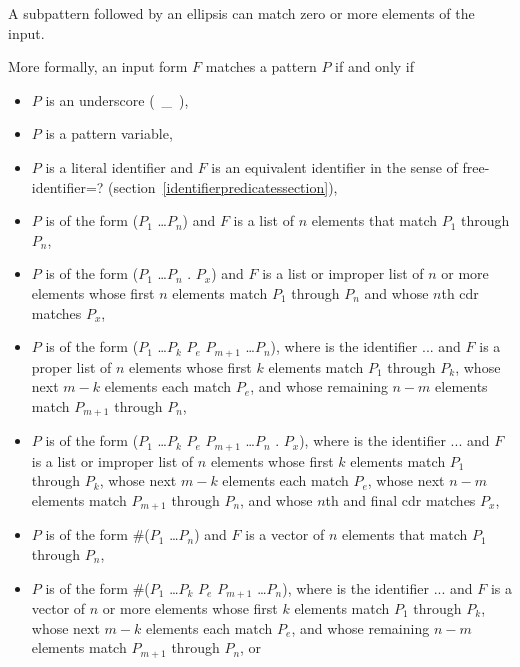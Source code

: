 \begin{entry}{%
}
A subpattern followed by an ellipsis can match zero or more elements of
the input.

More formally, an input form $F$ matches a pattern $P$ if and only if

\begin{itemize}
\item $P$ is an underscore (~{\cf \_}~),

\item $P$ is a pattern variable,

\item $P$ is a literal identifier
and $F$ is an equivalent identifier in the
sense of {\cf free-identifier=?}
(section~\ref{identifierpredicatessection}),

\item $P$ is of the form
{\cf ($P_1$ \dots $P_n$)}
and $F$ is a list of $n$ elements that match $P_1$ through
$P_n$,

\item $P$ is of the form
{\cf ($P_1$ \dots $P_n$ . $P_x$)}
and $F$ is a list or improper list of $n$ or more elements
whose first $n$ elements match $P_1$ through $P_n$
and
whose $n$th cdr matches $P_x$,

\item $P$ is of the form
{\cf ($P_1$ \dots $P_k$ $P_e$  $P_{m+1}$ \dots $P_n$)},
where  is the identifier {\cf ...}
and $F$ is a proper list of $n$
elements whose first $k$ elements match $P_1$ through $P_k$,
whose next $m-k$ elements each match $P_e$,
and
whose remaining $n-m$ elements match $P_{m+1}$ through $P_n$,

\item $P$ is of the form
{\cf ($P_1$ \dots $P_k$ $P_e$  $P_{m+1}$ \dots $P_n$ . $P_x$)},
where  is the identifier {\cf ...}
and $F$ is a list or improper list of $n$
elements whose first $k$ elements match $P_1$ through $P_k$,
whose next $m-k$ elements each match $P_e$,
whose next $n-m$ elements match $P_{m+1}$ through $P_n$,
and 
whose $n$th and final cdr matches $P_x$,

\item $P$ is of the form
{\cf \#($P_1$ \dots $P_n$)}
and $F$ is a vector of $n$ elements that match $P_1$ through
$P_n$,

\item $P$ is of the form
{\cf \#($P_1$ \dots $P_k$ $P_e$  $P_{m+1}$ \dots $P_n$)},
where  is the identifier {\cf ...}
and $F$ is a vector of $n$ or more elements
whose first $k$ elements match $P_1$ through $P_k$,
whose next $m-k$ elements each match $P_e$,
and
whose remaining $n-m$ elements match $P_{m+1}$ through $P_n$,
or


\end{itemize}
\end{entry}
